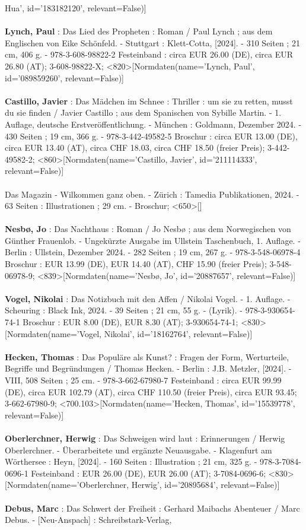 \documentclass{article}
\begin{document}
\begin{multicols}{3}
Hua', id='183182120', relevant=False)]\\\\\textbf{Lynch, Paul} : Das Lied des Propheten : Roman / Paul Lynch ; aus dem Englischen von Eike Schönfeld. - Stuttgart : Klett-Cotta, [2024]. - 310 Seiten ; 21 cm, 406 g. - 978-3-608-98822-2 Festeinband : circa EUR 26.00 (DE), circa EUR 26.80 (AT); 3-608-98822-X; <820>[Normdaten(name='Lynch, Paul', id='089859260', relevant=False)]\\\\\textbf{Castillo, Javier} : Das Mädchen im Schnee : Thriller : um sie zu retten, musst du sie finden / Javier Castillo ; aus dem Spanischen von Sybille Martin. - 1. Auflage, deutsche Erstveröffentlichung. - München : Goldmann, Dezember 2024. - 430 Seiten ; 19 cm, 366 g. - 978-3-442-49582-5 Broschur : circa EUR 13.00 (DE), circa EUR 13.40 (AT), circa CHF 18.03, circa CHF 18.50 (freier Preis); 3-442-49582-2; <860>[Normdaten(name='Castillo, Javier', id='211114333', relevant=False)]\\\\Das Magazin - Wilkommen ganz oben. - Zürich : Tamedia Publikationen, 2024. - 63 Seiten : Illustrationen ; 29 cm. - Broschur; <650>[]\\\\\textbf{Nesbø, Jo} : Das Nachthaus : Roman / Jo Nesbø ; aus dem Norwegischen von Günther Frauenlob. - Ungekürzte Ausgabe im Ullstein Taschenbuch, 1. Auflage. - Berlin : Ullstein, Dezember 2024. - 282 Seiten ; 19 cm, 267 g. - 978-3-548-06978-4 Broschur : EUR 13.99 (DE), EUR 14.40 (AT), CHF 15.90 (freier Preis); 3-548-06978-9; <839>[Normdaten(name='Nesbø, Jo', id='20887657', relevant=False)]\\\\\textbf{Vogel, Nikolai} : Das Notizbuch mit den Affen / Nikolai Vogel. - 1. Auflage. - Scheuring : Black Ink, 2024. - 39 Seiten ; 21 cm, 55 g. - (Lyrik). - 978-3-930654-74-1 Broschur : EUR 8.00 (DE), EUR 8.30 (AT); 3-930654-74-1; <830>[Normdaten(name='Vogel, Nikolai', id='18162764', relevant=False)]\\\\\textbf{Hecken, Thomas} : Das Populäre als Kunst? : Fragen der Form, Werturteile, Begriffe und Begründungen / Thomas Hecken. - Berlin : J.B. Metzler, [2024]. - VIII, 508 Seiten ; 25 cm. - 978-3-662-67980-7 Festeinband : circa EUR 99.99 (DE), circa EUR 102.79 (AT), circa CHF 110.50 (freier Preis), circa EUR 93.45; 3-662-67980-9; <700.103>[Normdaten(name='Hecken, Thomas', id='15539778', relevant=False)]\\\\\textbf{Oberlerchner, Herwig} : Das Schweigen wird laut : Erinnerungen / Herwig Oberlerchner. - Überarbeitete und ergänzte Neuausgabe. - Klagenfurt am Wörthersee : Heyn, [2024]. - 160 Seiten : Illustration ; 21 cm, 325 g. - 978-3-7084-0696-1 Festeinband : EUR 26.00 (DE), EUR 26.00 (AT); 3-7084-0696-6; <830>[Normdaten(name='Oberlerchner, Herwig', id='20895684', relevant=False)]\\\\\textbf{Debus, Marc} : Das Schwert der Freiheit : Gerhard Maibachs Abenteuer / Marc Debus. - [Neu-Anspach] : Schreibstark-Verlag, 
\end{multicols}
\end{document}
